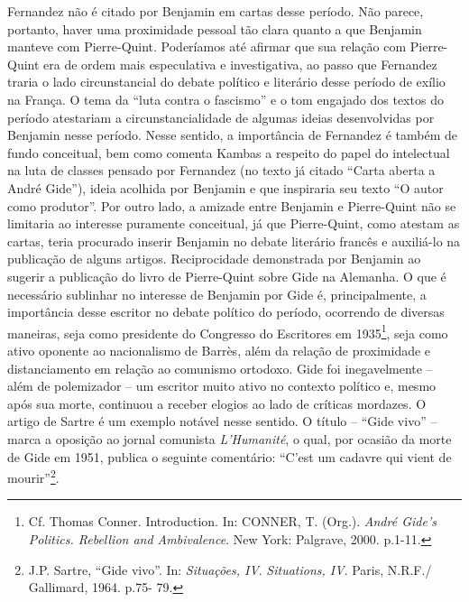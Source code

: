 Fernandez não é citado por Benjamin em cartas desse período. Não parece,
portanto, haver uma proximidade pessoal tão clara quanto a que Benjamin
manteve com Pierre-Quint. Poderíamos até afirmar que sua relação com
Pierre-Quint era de ordem mais especulativa e investigativa, ao passo
que Fernandez traria o lado circunstancial do debate político e
literário desse período de exílio na França. O tema da ``luta contra o
fascismo'' e o tom engajado dos textos do período atestariam a
circunstancialidade de algumas ideias desenvolvidas por Benjamin nesse
período. Nesse sentido, a importância de Fernandez é também de fundo
conceitual, bem como comenta Kambas a respeito do papel do intelectual
na luta de classes pensado por Fernandez (no texto já citado ``Carta
aberta a André Gide''), ideia acolhida por Benjamin e que inspiraria seu
texto ``O autor como produtor''. Por outro lado, a amizade entre
Benjamin e Pierre-Quint não se limitaria ao interesse puramente
conceitual, já que Pierre-Quint, como atestam as cartas, teria procurado
inserir Benjamin no debate literário francês e auxiliá-lo na publicação
de alguns artigos. Reciprocidade demonstrada por Benjamin ao sugerir a
publicação do livro de Pierre-Quint sobre Gide na Alemanha. O que é
necessário sublinhar no interesse de Benjamin por Gide é,
principalmente, a importância desse escritor no debate político do
período, ocorrendo de diversas maneiras, seja como presidente do
Congresso do Escritores em 1935\footnote{Cf. Thomas Conner.
  Introduction. In: CONNER, T. (Org.). \emph{André Gide's Politics.
  Rebellion and Ambivalence}. New York: Palgrave, 2000. p.1-11.}, seja
como ativo oponente ao nacionalismo de Barrès, além da relação de
proximidade e distanciamento em relação ao comunismo ortodoxo. Gide foi
inegavelmente -- além de polemizador -- um escritor muito ativo no
contexto político e, mesmo após sua morte, continuou a receber elogios
ao lado de críticas mordazes. O artigo de Sartre é um exemplo notável
nesse sentido. O título -- ``Gide vivo'' -- marca a oposição ao jornal
comunista \emph{L'Humanité}, o qual, por ocasião da morte de Gide em
1951, publica o seguinte comentário: ``C'est um cadavre qui vient de
mourir''\footnote{J.P. Sartre, ``Gide vivo''. In: \emph{Situações, IV}.
  \emph{Situations, IV}. Paris, N.R.F./ Gallimard, 1964. p.75- 79.}.

